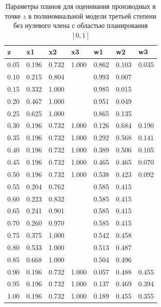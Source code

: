 \documentclass[specialist,
               substylefile = spbu.rtx,
               subf,href,colorlinks=true, 12pt]{disser}
\theoremstyle{definition}
\begin{document}
\begin{table}[]

\centering
\caption{Параметры планов для оценивания производных в точке $z$ в полиномиальной модели третьей степени без нулевого члена с областью планирования $[0, 1]$}
\begin{tabular}{l|llllll}
z    & x1    & x2    & x3    & w1    & w2      & w3     \\ \hline
\rowcolor[HTML]{C0C0C0} 
0.05 & 0.196 & 0.732 & 1.000 & 0.862 & 0.103 & 0.035 \\
0.10 & 0.215 & 0.804 &       & 0.993 & 0.007 &        \\
0.15 & 0.332 & 1.000 &       & 0.985 & 0.015 &        \\
0.20 & 0.467 & 1.000 &       & 0.951 & 0.049 &        \\
0.25 & 0.625 & 1.000 &       & 0.865 & 0.135 &        \\
\rowcolor[HTML]{C0C0C0} 
0.30 & 0.196 & 0.732 & 1.000 & 0.126 & 0.684 & 0.190 \\
\rowcolor[HTML]{C0C0C0} 
0.35 & 0.196 & 0.732 & 1.000 & 0.292 & 0.568 & 0.141 \\
\rowcolor[HTML]{C0C0C0} 
0.40 & 0.196 & 0.732 & 1.000 & 0.389 & 0.506 & 0.105 \\
\rowcolor[HTML]{C0C0C0} 
0.45 & 0.196 & 0.732 & 1.000 & 0.465 & 0.465 & 0.070 \\
\rowcolor[HTML]{C0C0C0} 
0.50 & 0.196 & 0.732 &  1.000     & 0.538 & 0.423 &  0.092      \\
0.55 & 0.204 & 0.762 &       & 0.585 & 0.415 &        \\
0.60 & 0.223 & 0.832 &       & 0.585 & 0.415 &        \\
0.65 & 0.241 & 0.901 &       & 0.585 & 0.415 &        \\
0.70 & 0.260 & 0.970 &       & 0.585 & 0.415   &        \\
0.75 & 0.375 & 1.000 &       & 0.542 & 0.458 &        \\
0.80 & 0.533 & 1.000 &       & 0.513 & 0.487 &        \\
0.85 & 0.668 & 1.000 &       & 0.504 & 0.496 &        \\
\rowcolor[HTML]{C0C0C0} 
0.90 & 0.196 & 0.732 & 1.000 & 0.057 & 0.488 & 0.455 \\
\rowcolor[HTML]{C0C0C0} 
0.95 & 0.196 & 0.732 & 1.000 & 0.137 & 0.469 & 0.394 \\
\rowcolor[HTML]{C0C0C0} 
1.00 & 0.196 & 0.732 & 1.000 & 0.189 & 0.455 & 0.355
\end{tabular}
\label{table:p3}
\end{table}
	
\end{document}
